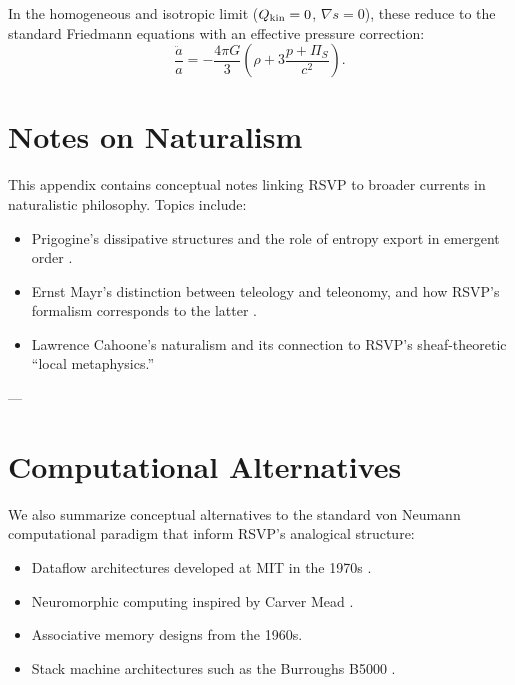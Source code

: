 \documentclass[12pt]{book}
\begin{document}
In the homogeneous and isotropic limit ($Q_{\rm kin}=0$,
$\nabla s=0$), these reduce to the standard Friedmann equations with an
effective pressure correction:
\begin{equation}
\frac{\ddot{a}}{a} = -\frac{4\pi G}{3}
\left(\rho + 3\frac{p+\Pi_S}{c^2}\right).
\end{equation}

\chapter{Notes on Naturalism}

This appendix contains conceptual notes linking RSVP to broader currents in
naturalistic philosophy. Topics include:

\begin{itemize}
\item Prigogine’s dissipative structures and the role of entropy export in
emergent order \citep{Prigogine1984}.
\item Ernst Mayr’s distinction between teleology and teleonomy, and how RSVP’s
formalism corresponds to the latter \citep{Mayr1961}.
\item Lawrence Cahoone’s naturalism and its connection to RSVP’s
sheaf-theoretic “local metaphysics.”
\end{itemize}

---

\chapter{Computational Alternatives}

We also summarize conceptual alternatives to the standard von Neumann
computational paradigm that inform RSVP’s analogical structure:

\begin{itemize}
\item Dataflow architectures developed at MIT in the 1970s
\citep{Arvind1986}.
\item Neuromorphic computing inspired by Carver Mead
\citep{Mead1990}.
\item Associative memory designs from the 1960s.
\item Stack machine architectures such as the Burroughs B5000
\citep{Burroughs1961}.
\end{itemize}




\end{document}
